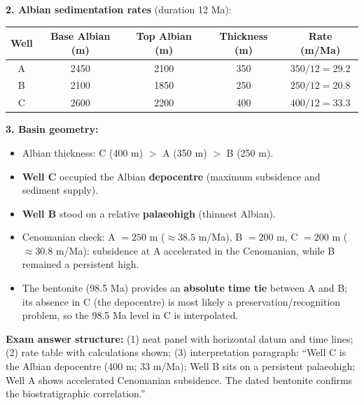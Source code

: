 \documentclass[11pt]{article}
\begin{document}
\begin{exoresolu}
\textbf{2. Albian sedimentation rates} (duration 12 Ma):

\begin{center}
\begin{tabular}{|c|c|c|c|c|}\hline
\rowcolor{popblueL}\textbf{Well} & \textbf{Base Albian (m)} & \textbf{Top Albian (m)} & \textbf{Thickness (m)} & \textbf{Rate (m/Ma)} \\ \hline
A & 2450 & 2100 & 350 & $350/12 = 29.2$ \\ \hline
B & 2100 & 1850 & 250 & $250/12 = 20.8$ \\ \hline
C & 2600 & 2200 & 400 & $400/12 = 33.3$ \\ \hline
\end{tabular}
\end{center}

\textbf{3. Basin geometry:}
\begin{itemize}
    \item Albian thickness: C (400 m) $>$ A (350 m) $>$ B (250 m).
    \item \textbf{Well C} occupied the Albian \textbf{depocentre} (maximum subsidence and sediment supply).
    \item \textbf{Well B} stood on a relative \textbf{palaeohigh} (thinnest Albian).
    \item Cenomanian check: A $= 250$ m ($\approx 38.5$ m/Ma), B $= 200$ m, C $= 200$ m ($\approx 30.8$ m/Ma): subsidence at A accelerated in the Cenomanian, while B remained a persistent high.
    \item The bentonite (98.5 Ma) provides an \textbf{absolute time tie} between A and B; its absence in C (the depocentre) is most likely a preservation/recognition problem, so the 98.5 Ma level in C is interpolated.
\end{itemize}

\textbf{Exam answer structure:} (1) neat panel with horizontal datum and time lines; (2) rate table with calculations shown; (3) interpretation paragraph: ``Well C is the Albian depocentre (400 m; 33 m/Ma); Well B sits on a persistent palaeohigh; Well A shows accelerated Cenomanian subsidence. The dated bentonite confirms the biostratigraphic correlation.''
\end{exoresolu}
\end{document}
